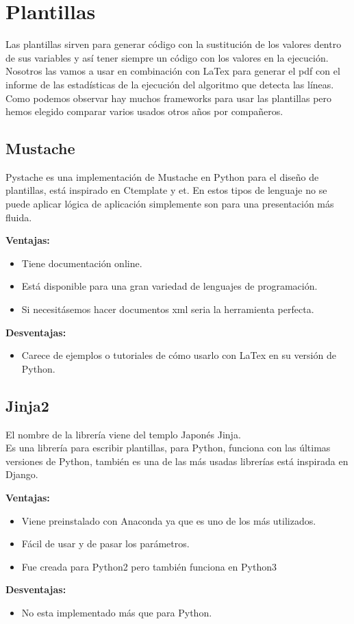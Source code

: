 \section{Plantillas}
Las plantillas sirven para generar código con la sustitución de los valores dentro de sus variables y así tener siempre un código con los valores en la ejecución.\\
Nosotros las vamos a usar en combinación con LaTex para generar el pdf con el informe de las estadísticas de la ejecución del algoritmo que detecta las líneas.\\
Como podemos observar hay muchos frameworks para usar las plantillas pero hemos elegido comparar varios usados otros años por compañeros.
\subsection{Mustache}
Pystache es una implementación de Mustache en Python para el diseño de plantillas, está inspirado en Ctemplate y et.
En estos tipos de lenguaje no se puede aplicar lógica de aplicación simplemente son para una presentación más fluida.

\textbf{Ventajas:}

\begin{itemize}
\item Tiene documentación online.
\item Está disponible para una gran variedad de lenguajes de programación.
\item Si necesitásemos hacer documentos xml seria la herramienta perfecta.
\end{itemize}

\textbf{Desventajas:}
\begin{itemize}
\item Carece de ejemplos o tutoriales de cómo usarlo con LaTex en su versión de Python.
\end{itemize}


\subsection{Jinja2}

El nombre de la librería viene del templo Japonés Jinja.\\
Es una librería para escribir plantillas, para Python, funciona con las últimas versiones de Python, también es una de las más usadas librerías está inspirada en Django.


\textbf{Ventajas:}
\begin{itemize}
\item Viene preinstalado con Anaconda ya que es uno de los más utilizados.
\item Fácil de usar y de pasar los parámetros.
\item Fue creada para Python2 pero también funciona en Python3
\end{itemize}
\textbf{Desventajas:}
\begin{itemize}
\item No esta implementado más que para Python.
\end{itemize}

